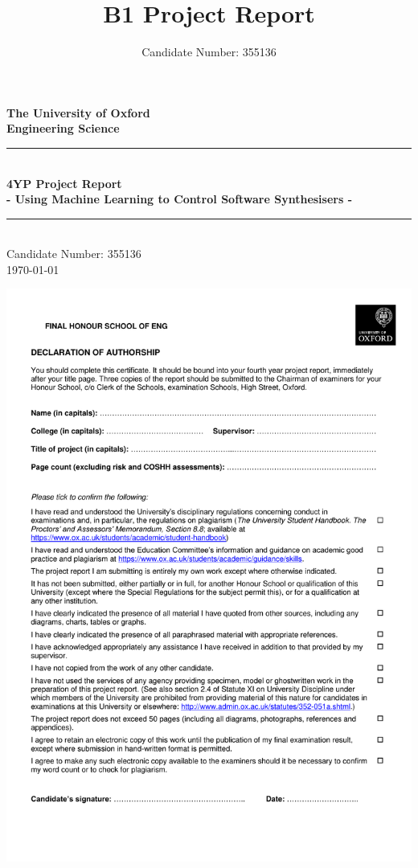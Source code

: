 \documentclass[11pt, oneside]{report}   	%
\title{B1 Project Report}
\author{Candidate Number: 355136}
\date{}							%
\newenvironment{changemargin}[3]{%
\begin{list}{}{%
\setlength{\topsep}{0pt}%
\setlength{\leftmargin}{#1}%
\setlength{\rightmargin}{#2}%
\setlength{\topmargin}{#3}%
\setlength{\listparindent}{\parindent}%
\setlength{\itemindent}{\parindent}%
\setlength{\parsep}{\parskip}%
}%
\item[]}{\end{list}}
\begin{document}

\begin{titlepage}
\begin{center}
\vspace*{1cm}
\Large {\textbf{The University of Oxford}}\\
\Large{\textbf{Engineering Science}}\\
\vfill
\noindent\rule{5in}{0.6pt}\\[1mm]
\huge{\textbf{4YP Project Report}}\\[3mm]
\Large{\textbf{- Using Machine Learning to Control Software Synthesisers  -}}\\[1mm]
\noindent\rule{5in}{0.6pt}\\[1mm]
\vfill
Candidate Number: 355136\\
\today\\
\end{center}
\end{titlepage}

\begin{changemargin}{-1in}{0in}{-1.5in}
\includegraphics{Declaration_of_Authorship_form_2018.pdf}
\thispagestyle{empty}
\end{changemargin}
\end{document}
